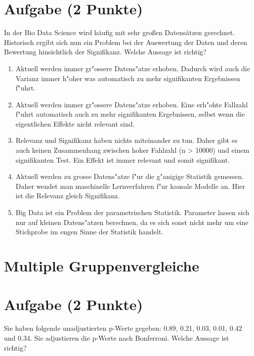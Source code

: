 \documentclass[a4paper, 9pt]{scrartcl}\usepackage[]{graphicx}\usepackage[]{xcolor}
\begin{document}
\section{Aufgabe \hfill (2 Punkte)}

In der Bio Data Science wird h{\"a}ufig mit sehr gro{\ss}en Datens{\"a}tzen
gerechnet. Historisch ergibt sich nun ein Problem bei der Auswertung der
Daten und deren Bewertung hinsichtlich der Signifikanz. Welche Aussage ist richtig?



\begin{enumerate}
\item [\textbf{A} \msquare] Aktuell werden immer gr{"o}ssere Datens{"a}tze erhoben. Dadurch wird auch die Varianz immer h{"o}her was automatisch zu mehr signifikanten Ergebnissen f{"u}hrt.
\item [\textbf{B} \msquare] Aktuell werden immer gr{"o}ssere Datens{"a}tze erhoben. Eine erh{"o}hte Fallzahl f{"u}hrt automatisch auch zu mehr signifikanten Ergebnissen, selbst wenn die eigentlichen Effekte nicht relevant sind.
\item [\textbf{C} \msquare] Relevanz und Signifikanz haben nichts miteinander zu tun. Daher gibt es auch keinen Zusammenhang zwischen hoher Fahlzahl (n > 10000) und einem signifikanten Test. Ein Effekt ist immer relevant und somit signifikant.
\item [\textbf{D} \msquare] Aktuell werden zu grosse Datens{"a}tze f{"u}r die g{"a}nigige Statistik gemessen. Daher wendet man maschinelle Lernverfahren f{"u}r kausale Modelle an. Hier ist die Relevanz gleich Signifikanz.
\item [\textbf{E} \msquare] Big Data ist ein Problem der parametrischen Statistik. Parameter lassen sich nur auf kleinen Datens{"a}tzen berechnen, da es sich sonst nicht mehr um eine Stichprobe im engen Sinne der Statistik handelt.
\end{enumerate}
\section*{Multiple Gruppenvergleiche}    

\section{Aufgabe \hfill (2 Punkte)}



Sie haben folgende unadjustierten p-Werte gegeben: 0.89, 0.21, 0.03, 0.01, 0.42 und 0.34. Sie adjustieren die p-Werte nach
Bonferroni. Welche Aussage ist richtig?
\end{document}
